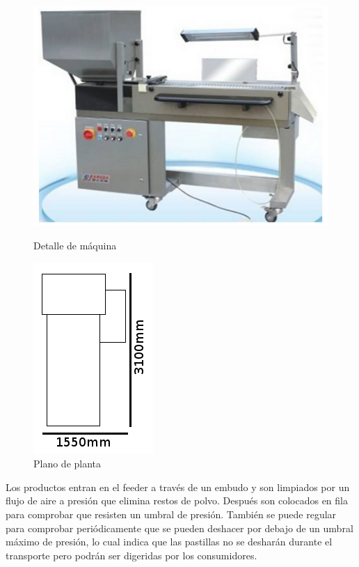 	\begin{figure}[htp]
		\begin{minipage}{.48\textwidth}
			\centering
			\includegraphics[scale=0.6]{Datasheets/3Foto.png}
			\caption{Detalle de máquina}
			\label{fig:testa}
		\end{minipage}
		\begin{minipage}{.48\textwidth}
			\centering
			\includegraphics[scale=0.8]{Datasheets/Miniaturas/verificacion.png}
			\caption{Plano de planta}
			\label{fig:testb}
		\end{minipage}
	\end{figure}
	

	Los productos entran en el feeder a través de un embudo y son limpiados por un flujo de aire a presión que elimina restos de polvo. Después son colocados en fila para comprobar que resisten un umbral de presión. También se puede regular para comprobar periódicamente que se pueden deshacer por debajo de un umbral máximo de presión, lo cual indica que las pastillas no se desharán durante el transporte pero podrán ser digeridas por los consumidores.\\


